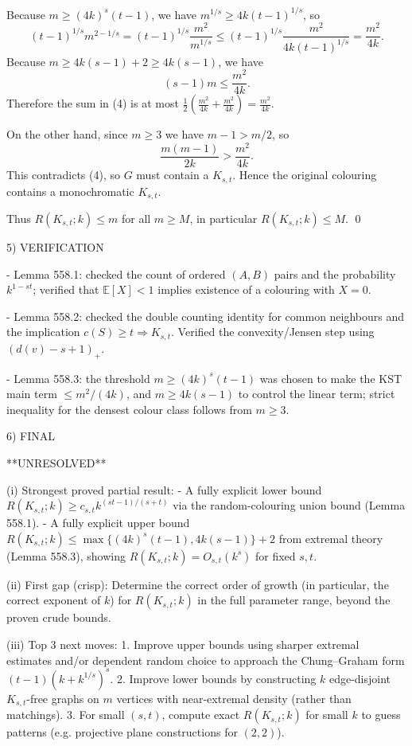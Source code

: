 Because $m\ge (4k)^s(t-1)$, we have $m^{1/s}\ge 4k(t-1)^{1/s}$, so
\[
(t-1)^{1/s}m^{2-1/s}=(t-1)^{1/s}\frac{m^2}{m^{1/s}}\le (t-1)^{1/s}\frac{m^2}{4k(t-1)^{1/s}}=\frac{m^2}{4k}.
\]
Because $m\ge 4k(s-1)+2\ge 4k(s-1)$, we have
\[
(s-1)m\le \frac{m^2}{4k}.
\]
Therefore the sum in (4) is at most $\frac12(\frac{m^2}{4k}+\frac{m^2}{4k})=\frac{m^2}{4k}$.

On the other hand, since $m\ge 3$ we have $m-1>m/2$, so
\[
\frac{m(m-1)}{2k}>\frac{m^2}{4k}.
\]
This contradicts (4), so $G$ must contain a $K_{s,t}$.
Hence the original colouring contains a monochromatic $K_{s,t}$.

Thus $R(K_{s,t};k)\le m$ for all $m\ge M$, in particular $R(K_{s,t};k)\le M$.
\qed

5) VERIFICATION

- Lemma 558.1: checked the count of ordered $(A,B)$ pairs and the probability $k^{1-st}$; verified that $\mathbb E[X]<1$ implies existence of a colouring with $X=0$.

- Lemma 558.2: checked the double counting identity for common neighbours and the implication $c(S)\ge t\Rightarrow K_{s,t}$. Verified the convexity/Jensen step using $(d(v)-s+1)_+$.

- Lemma 558.3: the threshold $m\ge (4k)^s(t-1)$ was chosen to make the KST main term $\le m^2/(4k)$, and $m\ge 4k(s-1)$ to control the linear term; strict inequality for the densest colour class follows from $m\ge 3$.

6) FINAL

**UNRESOLVED**

(i) Strongest proved partial result:
- A fully explicit lower bound $R(K_{s,t};k)\ge c_{s,t}k^{(st-1)/(s+t)}$ via the random-colouring union bound (Lemma 558.1).
- A fully explicit upper bound $R(K_{s,t};k)\le \max\{(4k)^s(t-1),4k(s-1)\}+2$ from extremal theory (Lemma 558.3), showing $R(K_{s,t};k)=O_{s,t}(k^s)$ for fixed $s,t$.

(ii) First gap (crisp):
Determine the correct order of growth (in particular, the correct exponent of $k$) for $R(K_{s,t};k)$ in the full parameter range, beyond the proven crude bounds.

(iii) Top 3 next moves:
1. Improve upper bounds using sharper extremal estimates and/or dependent random choice to approach the Chung--Graham form $(t-1)(k+k^{1/s})^s$.
2. Improve lower bounds by constructing $k$ edge-disjoint $K_{s,t}$-free graphs on $m$ vertices with near-extremal density (rather than matchings).
3. For small $(s,t)$, compute exact $R(K_{s,t};k)$ for small $k$ to guess patterns (e.g. projective plane constructions for $(2,2)$).

